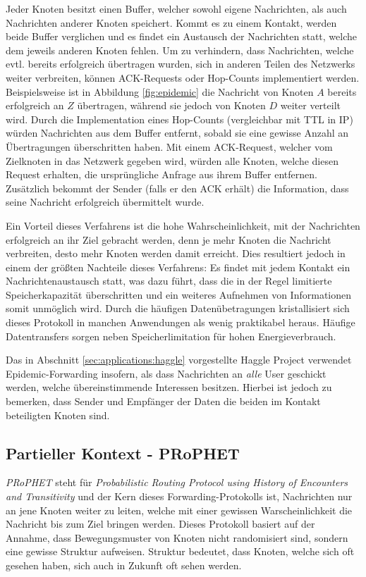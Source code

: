 \documentclass[a4paper, 12pt]{article}
\begin{document}
Jeder Knoten besitzt einen Buffer, welcher sowohl eigene Nachrichten, als auch Nachrichten anderer Knoten speichert. Kommt es zu einem Kontakt, werden beide Buffer verglichen und es findet ein Austausch der Nachrichten statt, welche dem jeweils anderen Knoten fehlen.
Um zu verhindern, dass Nachrichten, welche evtl. bereits erfolgreich übertragen wurden, sich in anderen Teilen des Netzwerks weiter verbreiten, können ACK-Requests oder Hop-Counts implementiert werden. Beispielsweise ist in Abbildung \ref{fig:epidemic} die Nachricht von Knoten $A$ bereits erfolgreich an $Z$ übertragen, während sie jedoch von Knoten $D$ weiter verteilt wird.
Durch die Implementation eines Hop-Counts (vergleichbar mit TTL in IP) würden Nachrichten aus dem Buffer entfernt, sobald sie eine gewisse Anzahl an Übertragungen überschritten haben.
Mit einem ACK-Request, welcher vom Zielknoten in das Netzwerk gegeben wird, würden alle Knoten, welche diesen Request erhalten, die ursprüngliche Anfrage aus ihrem Buffer entfernen. Zusätzlich bekommt der Sender (falls er den ACK erhält) die Information, dass seine Nachricht erfolgreich übermittelt wurde.

Ein Vorteil dieses Verfahrens ist die hohe Wahrscheinlichkeit, mit der Nachrichten erfolgreich an ihr Ziel gebracht werden, denn je mehr Knoten die Nachricht verbreiten, desto mehr Knoten werden damit erreicht.
Dies resultiert jedoch in einem der größten Nachteile dieses Verfahrens: Es findet mit jedem Kontakt ein Nachrichtenaustausch statt, was dazu führt, dass die in der Regel limitierte Speicherkapazität überschritten und ein weiteres Aufnehmen von Informationen somit unmöglich wird.
Durch die häufigen Datenübetragungen kristallisiert sich dieses Protokoll in manchen Anwendungen als wenig praktikabel heraus. Häufige Datentransfers sorgen neben Speicherlimitation für hohen Energieverbrauch.

Das in Abschnitt \ref{sec:applications:haggle} vorgestellte Haggle Project verwendet Epidemic-Forwarding insofern, als dass Nachrichten an \emph{alle} User geschickt werden, welche übereinstimmende Interessen besitzen. Hierbei ist jedoch zu bemerken, dass Sender und Empfänger der Daten die beiden im Kontakt beteiligten Knoten sind.

\subsection{Partieller Kontext - PRoPHET}
\emph{PRoPHET} \cite{lindgren2003probabilistic} steht für \emph{Probabilistic Routing Protocol using History of Encounters and Transitivity} und der Kern dieses Forwarding-Protokolls ist, Nachrichten nur an jene Knoten weiter zu leiten, welche mit einer gewissen Warscheinlichkeit die Nachricht bis zum Ziel bringen werden. 
Dieses Protokoll basiert auf der Annahme, dass Bewegungsmuster von Knoten nicht randomisiert sind, sondern eine gewisse Struktur aufweisen. Struktur bedeutet, dass Knoten, welche sich oft gesehen haben, sich auch in Zukunft oft sehen werden.
\end{document}
